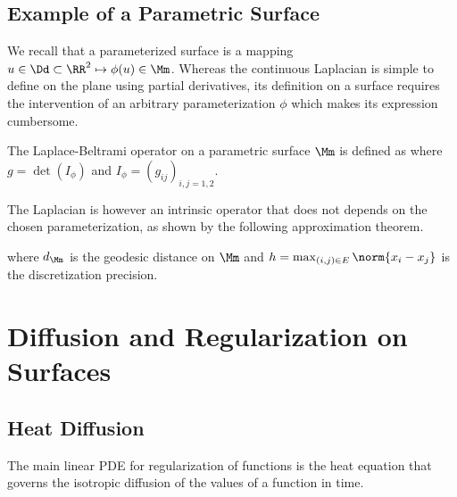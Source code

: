\subsection{Example of a Parametric Surface}

We recall that a parameterized surface is a mapping $u \in \Dd \subset \RR^2 \mapsto \phi(u) \in \Mm$. Whereas the continuous Laplacian is simple to define on the plane using partial derivatives, its definition on a surface requires the intervention of an arbitrary parameterization $\phi$ which makes its expression cumbersome. 
 
\begin{defn} \label{defn-laplace-beltrami}
The Laplace-Beltrami operator on a parametric surface $\Mm$ is defined as
where $g=\det(I_\phi)$ and $I_\phi = (g_{ij})_{i,j=1,2}$.
\end{defn}

The Laplacian is however an intrinsic operator that does not depends on the chosen parameterization, as shown by the following approximation theorem.

\begin{rem}
where $d_{\Mm}$ is the geodesic distance on $\Mm$ and $h = \max_{(i,j) \in E} \norm{x_i-x_j}$ is the discretization precision. 
\end{rem}


\section{Diffusion and Regularization on Surfaces}

\subsection{Heat Diffusion}

The main linear PDE for regularization of functions is the heat equation that governs the isotropic diffusion of the values of a function in time.

